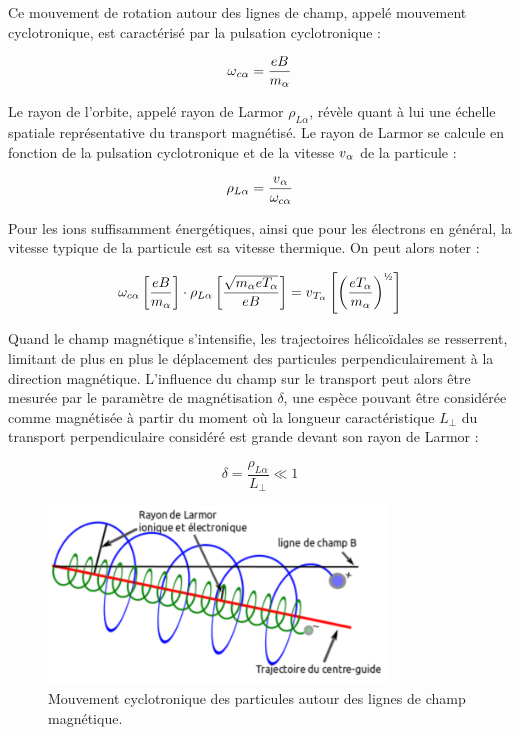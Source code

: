 \begin{refsection}
Ce mouvement de rotation autour des lignes de champ, appelé mouvement
cyclotronique, est caractérisé par la pulsation cyclotronique : 

\begin{equation}
\omega{_{{c\alpha}}}=\frac{e B}{m_\alpha}
\end{equation}

Le rayon de l'orbite, appelé rayon de Larmor $\rho_{L\alpha}$, révèle quant à
lui une échelle spatiale représentative du transport magnétisé.
Le rayon de Larmor se calcule en fonction de la pulsation cyclotronique et de la vitesse
$v{_{\alpha}}$ de la particule :

\begin{equation}
\rho_{L \alpha}
=\frac{v{_{\alpha}}}{\omega_{c{\alpha}}}
\end{equation}

Pour les ions suffisamment énergétiques, ainsi que pour les électrons en général,
la vitesse typique de la particule est sa vitesse thermique. On peut alors noter :

\begin{equation}
\omega_{c\alpha}\left[\frac{e B}{m_\alpha}\right]
\cdot\rho_{L\alpha}\left[\frac{\sqrt{m_\alpha eT_\alpha}}{eB}\right]
=v\indice{T_{\alpha}}\left[\left(\frac{eT_{\alpha}}{m_{\alpha}}\right)^{\text{\textonehalf}}\right]
\end{equation}

Quand le champ magnétique s'intensifie, les trajectoires
hélicoïdales se resserrent, limitant de plus en plus le déplacement des
particules perpendiculairement à la direction magnétique. L'influence du champ
sur le transport peut alors être mesurée par le paramètre de
magnétisation $\delta$, une espèce pouvant être considérée comme magnétisée à
partir du moment où la longueur caractéristique $L_\perp$ du transport
perpendiculaire considéré est grande devant son rayon de Larmor :

\begin{equation}
\delta=\frac{\rho_{L\alpha}}{L_\perp}\ll 1
\end{equation}

\begin{figure}[htbp]
\centering
\includegraphics[width=0.8\textwidth]{figures/1-mouvementCyclotron.png}
{\caption{Mouvement cyclotronique des particules autour des lignes de champ
magnétique.}\label{1-particleDrifts}}
\end{figure}


\end{refsection}

